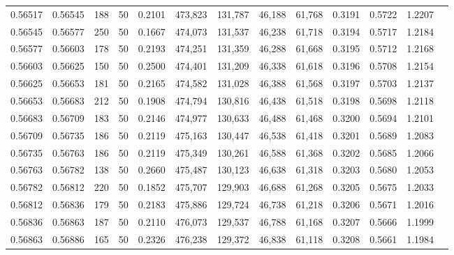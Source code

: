 \begin{tabular}{rrrrrrrrrrrrr}
0.56517 & 0.56545 &   188 &  50 &                                     0.2101 & 473,823 & 131,787 &  46,188 &  61,768 & 0.3191 & 0.5722 & 1.2207 \\
0.56545 & 0.56577 &   250 &  50 &                                     0.1667 & 474,073 & 131,537 &  46,238 &  61,718 & 0.3194 & 0.5717 & 1.2184 \\
0.56577 & 0.56603 &   178 &  50 &                                     0.2193 & 474,251 & 131,359 &  46,288 &  61,668 & 0.3195 & 0.5712 & 1.2168 \\
0.56603 & 0.56625 &   150 &  50 &                                     0.2500 & 474,401 & 131,209 &  46,338 &  61,618 & 0.3196 & 0.5708 & 1.2154 \\
0.56625 & 0.56653 &   181 &  50 &                                     0.2165 & 474,582 & 131,028 &  46,388 &  61,568 & 0.3197 & 0.5703 & 1.2137 \\
0.56653 & 0.56683 &   212 &  50 &                                     0.1908 & 474,794 & 130,816 &  46,438 &  61,518 & 0.3198 & 0.5698 & 1.2118 \\
0.56683 & 0.56709 &   183 &  50 &                                     0.2146 & 474,977 & 130,633 &  46,488 &  61,468 & 0.3200 & 0.5694 & 1.2101 \\
0.56709 & 0.56735 &   186 &  50 &                                     0.2119 & 475,163 & 130,447 &  46,538 &  61,418 & 0.3201 & 0.5689 & 1.2083 \\
0.56735 & 0.56763 &   186 &  50 &                                     0.2119 & 475,349 & 130,261 &  46,588 &  61,368 & 0.3202 & 0.5685 & 1.2066 \\
0.56763 & 0.56782 &   138 &  50 &                                     0.2660 & 475,487 & 130,123 &  46,638 &  61,318 & 0.3203 & 0.5680 & 1.2053 \\
0.56782 & 0.56812 &   220 &  50 &                                     0.1852 & 475,707 & 129,903 &  46,688 &  61,268 & 0.3205 & 0.5675 & 1.2033 \\
0.56812 & 0.56836 &   179 &  50 &                                     0.2183 & 475,886 & 129,724 &  46,738 &  61,218 & 0.3206 & 0.5671 & 1.2016 \\
0.56836 & 0.56863 &   187 &  50 &                                     0.2110 & 476,073 & 129,537 &  46,788 &  61,168 & 0.3207 & 0.5666 & 1.1999 \\
0.56863 & 0.56886 &   165 &  50 &                                     0.2326 & 476,238 & 129,372 &  46,838 &  61,118 & 0.3208 & 0.5661 & 1.1984 \\

\end{tabular}
